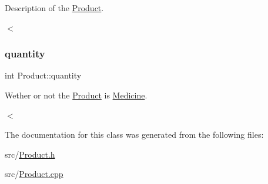 Description of the \hyperlink{classProduct}{Product}. 

$<$ \mbox{\label{classProduct_a299430b8756aba9f6d44af46831791cc}} 
\subsubsection{\texorpdfstring{quantity}{quantity}}
{\footnotesize\ttfamily int Product\+::quantity\hspace{0.3cm}{\ttfamily [private]}}



Wether or not the \hyperlink{classProduct}{Product} is \hyperlink{classMedicine}{Medicine}. 

$<$ 

The documentation for this class was generated from the following files\+:\begin{DoxyCompactItemize}
\item 
src/\hyperlink{Product_8h}{Product.\+h}\item 
src/\hyperlink{Product_8cpp}{Product.\+cpp}\end{DoxyCompactItemize}
